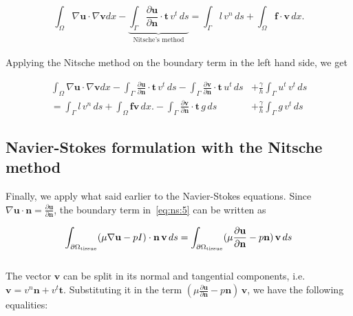 \documentclass[11pt,a4paper,titlepage]{report}
\begin{document}
\begin{equation}
\int_\Omega \nabla \mathbf{u} \cdot \nabla \mathbf{v} dx
-  \underbrace{ \int_{\Gamma} \frac{\partial \mathbf{u}}{\partial \mathbf{n}} \cdot \mathbf{t} \, v^t \, ds }_\text{Nitsche's method}
=  \int_{\Gamma} l \, v^n \, ds 
+ \int_\Omega \mathbf{f \cdot v} \, dx.
\end{equation}
\\
Applying the Nitsche method on the boundary term in the left hand side, we get

\begin{equation}
\begin{split}
\int_\Omega \nabla \mathbf{u} \cdot \nabla \mathbf{v} dx
- \int_{\Gamma} \frac{\partial \mathbf{u}}{\partial \mathbf{n}} \cdot \mathbf{t} \, v^t \, ds 
- \int_{\Gamma} \frac{\partial \mathbf{v}}{\partial \mathbf{n}} \cdot \mathbf{t} \, u^t \, ds
&+ \frac{\gamma}{h} \int_{\Gamma} u^t \, v^t \, ds \\
=  \int_{\Gamma} l \, v^n \, ds
+ \int_\Omega \mathbf{fv} \, dx.
- \int_{\Gamma} \frac{\partial \mathbf{v}}{\partial \mathbf{n}} \cdot \mathbf{t} \, g \, ds
&+ \frac{\gamma}{h} \int_{\Gamma} g \, v^t \, ds
\end{split}
\end{equation}

\subsection{Navier-Stokes formulation with the Nitsche method}
Finally, we apply what said earlier to the Navier-Stokes equations. Since $\nabla \mathbf{u} \cdot \mathbf{n} = \frac{\partial \mathbf{u}}{\partial \mathbf{n}}$, the boundary term in~\eqref{eq:ns:5} can be written as

\begin{equation}
\label{eq:ns:6}
\int_{\partial \Omega_{\rm tissue}} (\mu \nabla \mathbf{u} -  pI) \cdot \mathbf{n} \, \mathbf{v} \, ds
= \int_{\partial \Omega_{\rm tissue}} (\mu \frac{\partial \mathbf{u}}{\partial \mathbf{n}} -  p \mathbf{n}) \, \mathbf{v} \, ds \\ 
\end{equation}
\\
The vector $\mathbf{v}$ can be split in its normal and tangential components, i.e. $\mathbf{v} = v^n \mathbf{n} + v^t \mathbf{t}$. Substituting it in the term $(\mu \frac{\partial \mathbf{u}}{\partial \mathbf{n}} -  p \mathbf{n}) \, \mathbf{v}$, we have the following equalities:
\end{document}
